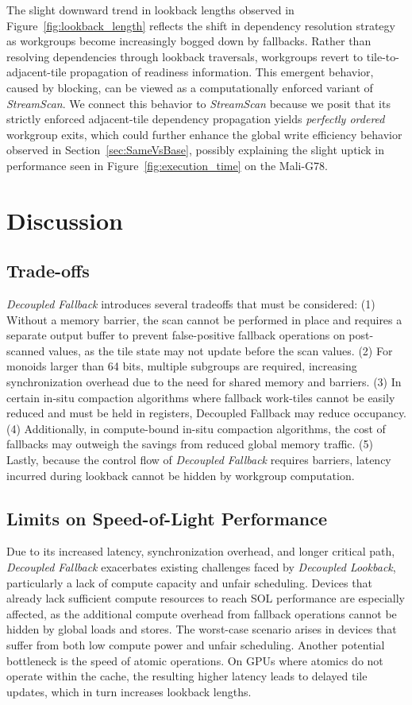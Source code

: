 \documentclass[sigconf,screen]{acmart}
\begin{document}
The slight downward trend in lookback lengths observed in Figure~\ref{fig:lookback_length} reflects the shift in dependency resolution strategy as workgroups become increasingly bogged down by fallbacks. Rather than resolving dependencies through lookback traversals, workgroups revert to tile-to-adjacent-tile propagation of readiness information. This emergent behavior, caused by blocking, can be viewed as a computationally enforced variant of \emph{StreamScan}. We connect this behavior to \emph{StreamScan} because we posit that its strictly enforced adjacent-tile dependency propagation yields \emph{perfectly ordered} workgroup exits, which could further enhance the global write efficiency behavior observed in Section~\ref{sec:SameVsBase}, possibly explaining the slight uptick in performance seen in Figure~\ref{fig:execution_time} on the Mali-G78.

\section{Discussion}

\subsection{Trade-offs}
\emph{Decoupled Fallback} introduces several tradeoffs that must be considered: (1) Without a memory barrier, the scan cannot be performed in place and requires a separate output buffer to prevent false-positive fallback operations on post-scanned values, as the tile state may not update before the scan values. (2) For monoids larger than 64 bits, multiple subgroups are required, increasing synchronization overhead due to the need for shared memory and barriers. (3) In certain in-situ compaction algorithms where fallback work-tiles cannot be easily reduced and must be held in registers, Decoupled Fallback may reduce occupancy. (4) Additionally, in compute-bound in-situ compaction algorithms, the cost of fallbacks may outweigh the savings from reduced global memory traffic. (5) Lastly, because the control flow of \emph{Decoupled Fallback} requires barriers, latency incurred during lookback cannot be hidden by workgroup computation.

\subsection{Limits on Speed-of-Light Performance}
Due to its increased latency, synchronization overhead, and longer critical path, \emph{Decoupled Fallback} exacerbates existing challenges faced by \emph{Decoupled Lookback}, particularly a lack of compute capacity and unfair scheduling. Devices that already lack sufficient compute resources to reach SOL performance are especially affected, as the additional compute overhead from fallback operations cannot be hidden by global loads and stores. The worst-case scenario arises in devices that suffer from both low compute power and unfair scheduling. Another potential bottleneck is the speed of atomic operations. On GPUs where atomics do not operate within the cache, the resulting higher latency leads to delayed tile updates, which in turn increases lookback lengths.
\end{document}
